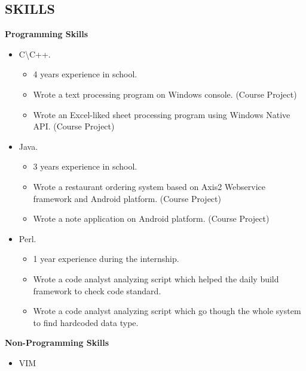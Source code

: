 \documentclass[margin]{res}
\begin{document}
\begin{resume}
\section{SKILLS}
{\bf Programming Skills}
\begin{itemize}
\item C\textbackslash C++.
\begin{itemize}
\item 4 years experience in school.
\item Wrote a text processing program on Windows console. (Course Project)
\item Wrote an Excel-liked sheet processing program using Windows Native API. (Course Project)
\end{itemize}
\item Java.
\begin{itemize}
\item 3 years experience in school.
\item Wrote a restaurant ordering system based on Axis2 Webservice framework and Android platform. (Course Project)
\item Wrote a note application on Android platform. (Course Project)
\end{itemize}
\item Perl.
\begin{itemize}
\item 1 year experience during the internship.
\item Wrote a code analyst analyzing script which helped the daily build framework to check code standard.
\item Wrote a code analyst analyzing script which go though the whole system to find hardcoded data type.
\end{itemize}
\end{itemize}
{\bf Non-Programming Skills}
\begin{itemize}
\item VIM
\end{itemize}


\end{resume}
\end{document}
